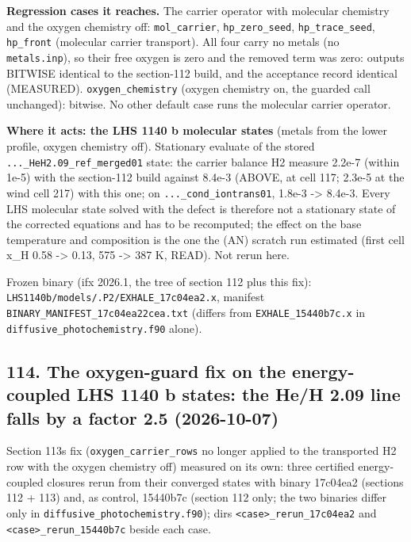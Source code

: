 \documentclass[english,a4paper]{my_memo}
\begin{document}
\textbf{Regression cases it reaches.} The carrier operator with molecular
chemistry and the oxygen chemistry off: \texttt{mol\_carrier}, \texttt{hp\_zero\_seed},
\texttt{hp\_trace\_seed}, \texttt{hp\_front} (molecular carrier transport). All four carry no
metals (no \texttt{metals.inp}), so their free oxygen is zero and the removed term
was zero: outputs BITWISE identical to the section-112 build, and the
acceptance record identical (MEASURED). \texttt{oxygen\_chemistry} (oxygen chemistry
on, the guarded call unchanged): bitwise. No other default case runs the
molecular carrier operator.

\textbf{Where it acts: the LHS 1140 b molecular states} (metals from the lower
profile, oxygen chemistry off). Stationary evaluate of the stored
\texttt{...\_HeH2.09\_ref\_merged01} state: the carrier balance H2 measure
2.2e-7 (within 1e-5) with the section-112 build against 8.4e-3 (ABOVE, at
cell 117; 2.3e-5 at the wind cell 217) with this one; on
\texttt{...\_cond\_iontrans01}, 1.8e-3 -\textgreater{} 8.4e-3. Every LHS molecular state solved
with the defect is therefore not a stationary state of the corrected
equations and has to be recomputed; the effect on the base temperature and
composition is the one the (AN) scratch run estimated (first cell x\_H
0.58 -\textgreater{} 0.13, 575 -\textgreater{} 387 K, READ). Not rerun here.

Frozen binary (ifx 2026.1, the tree of section 112 plus this fix):
\texttt{LHS1140b/models/.P2/EXHALE\_17c04ea2.x}, manifest
\texttt{BINARY\_MANIFEST\_17c04ea22cea.txt} (differs from \texttt{EXHALE\_15440b7c.x} in
\texttt{diffusive\_photochemistry.f90} alone).

\subsection{114. The oxygen-guard fix on the energy-coupled LHS 1140 b states: the He/H 2.09 line falls by a factor 2.5 (2026-10-07)}\label{114-the-oxygen-guard-fix-on-the-energy-coupled-lhs-1140-b-states-the-heh-209-line-falls-by-a-factor-25-2026-10-07}

Section 113\textquotesingle s fix (\texttt{oxygen\_carrier\_rows} no longer applied to the transported
H2 row with the oxygen chemistry off) measured on its own: three certified
energy-coupled closures rerun from their converged states with binary
17c04ea2 (sections 112 + 113) and, as control, 15440b7c (section 112 only;
the two binaries differ only in \texttt{diffusive\_photochemistry.f90}); dirs
\texttt{\textless{}case\textgreater{}\_rerun\_17c04ea2} and \texttt{\textless{}case\textgreater{}\_rerun\_15440b7c} beside each case.
\end{document}
